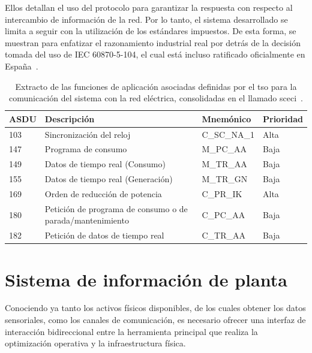 Ellos detallan el uso del protocolo para garantizar la respuesta con respecto al intercambio de información de la red. Por lo tanto, el sistema desarrollado se limita a seguir con la utilización de los estándares impuestos. De esta forma, se muestran para enfatizar el razonamiento industrial real por detrás de la decisión tomada del uso de IEC 60870-5-104, el cual está incluso ratificado oficialmente en España~\cite{une2017equipos}.

\begin{table}[ht]
  \centering
  \begin{tabular}{|l|p{7.5cm}|l|l|}
    \hline
    ASDU & Descripción                                               & Mnemónico   & Prioridad \\
    \hline
    103  & Sincronización del reloj                                  & C\_SC\_NA\_1 & Alta     \\
    147  & Programa de consumo                                       & M\_PC\_AA    & Baja     \\
    149  & Datos de tiempo real (Consumo)                            & M\_TR\_AA    & Baja     \\
    155  & Datos de tiempo real (Generación)                         & M\_TR\_GN    & Baja     \\
    169  & Orden de reducción de potencia                            & C\_PR\_IK    & Alta     \\
    180  & Petición de programa de consumo o de parada/mantenimiento & C\_PC\_AA    & Baja     \\
    182  & Petición de datos de tiempo real                          & C\_TR\_AA    & Baja     \\
    \hline
  \end{tabular}
  \caption{Extracto de las funciones de aplicación asociadas definidas por el \gls{tso} para la comunicación del sistema con la red eléctrica, consolidadas en el llamado \gls{sceci}~\cite{ree2009protocolo}.}
  \label{tab:funciones-de-aplicación-red}
\end{table}

\section{Sistema de información de planta}
\label{makereference3.4}

Conociendo ya tanto los activos físicos disponibles, de los cuales obtener los datos sensoriales, como los canales de comunicación, es necesario ofrecer una interfaz de interacción bidireccional entre la herramienta principal que realiza la optimización operativa y la infraestructura física.

